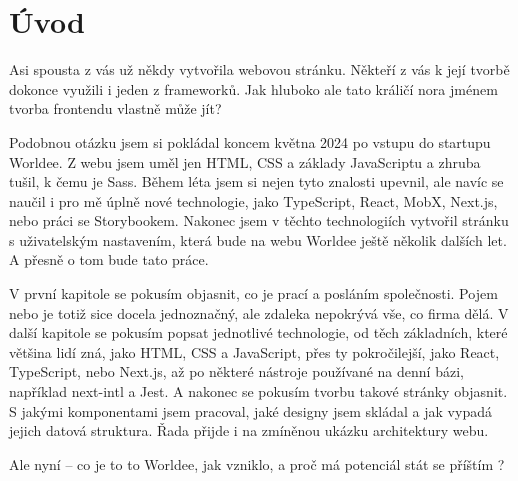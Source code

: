\chapter*{Úvod}

Asi spousta z vás už někdy vytvořila webovou stránku. Někteří z vás k její tvorbě dokonce využili i jeden z frameworků. Jak hluboko ale tato králičí nora jménem tvorba frontendu vlastně může jít?

Podobnou otázku jsem si pokládal koncem května 2024 po vstupu do startupu Worldee. Z webu jsem uměl jen HTML, CSS a základy JavaScriptu a zhruba tušil, k čemu je Sass. Během léta jsem si nejen tyto znalosti upevnil, ale navíc se naučil i pro mě úplně nové technologie, jako TypeScript, React, MobX, Next.js, nebo práci se Storybookem. Nakonec jsem v těchto technologiích vytvořil stránku s uživatelským nastavením, která bude na webu Worldee ještě několik dalších let. A přesně o tom bude tato práce.

V první kapitole se pokusím objasnit, co je prací a posláním společnosti. Pojem  nebo  je totiž sice docela jednoznačný, ale zdaleka nepokrývá vše, co firma dělá. V další kapitole se pokusím popsat jednotlivé technologie, od těch základních, které většina lidí zná, jako HTML, CSS a JavaScript, přes
ty pokročilejší, jako React, TypeScript, nebo Next.js, až po některé nástroje používané na denní bázi, například next-intl a Jest. A nakonec se pokusím tvorbu takové stránky objasnit. S jakými komponentami jsem pracoval, jaké designy jsem skládal a jak vypadá jejich datová struktura. Řada přijde i na zmíněnou ukázku architektury webu.

Ale nyní – co je to to Worldee, jak vzniklo, a proč má potenciál stát se příštím ?